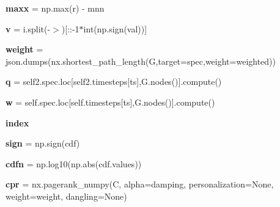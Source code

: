 \begin{DoxyCompactItemize}
{\bfseries maxx} = np.\+max(r) -\/ mnn
\item 
\mbox{\label{namespacedsmacc_1_1vis_1_1degree_a59c87c466c653809fae9841bcd32c50a}} 
{\bfseries v} = i.\+split(\textquotesingle{}-\/$>$\textquotesingle{})\mbox{[}\+::-\/1$\ast$int(np.\+sign(val))\mbox{]}
\item 
\mbox{\label{namespacedsmacc_1_1vis_1_1degree_a786d4650deeb1a42441417854f5e0d3d}} 
{\bfseries weight} = json.\+dumps(nx.\+shortest\+\_\+path\+\_\+length(G,target=spec,weight=\textquotesingle{}weighted\textquotesingle{}))
\item 
\mbox{\label{namespacedsmacc_1_1vis_1_1degree_ab4ec10eea9412ccc263613ab58af6801}} 
{\bfseries q} = self2.\+spec.\+loc\mbox{[}self2.\+timesteps\mbox{[}ts\mbox{]},G.\+nodes()\mbox{]}.compute()
\item 
\mbox{\label{namespacedsmacc_1_1vis_1_1degree_a66742a6a9321dd42f1c47bb67d12ef13}} 
{\bfseries w} = self.\+spec.\+loc\mbox{[}self.\+timesteps\mbox{[}ts\mbox{]},G.\+nodes()\mbox{]}.compute()
\item 
\mbox{\label{namespacedsmacc_1_1vis_1_1degree_a35f6746a73068c2d6fc773a56a6f695d}} 
{\bfseries index}
\item 
\mbox{\label{namespacedsmacc_1_1vis_1_1degree_a38a8e81b43ba523315b33ea71cc870a0}} 
{\bfseries sign} = np.\+sign(cdf)
\item 
\mbox{\label{namespacedsmacc_1_1vis_1_1degree_a59dc121c6d926d87b664f210eb1f8f05}} 
{\bfseries cdfn} = np.\+log10(np.\+abs(cdf.\+values))
\item 
\mbox{\label{namespacedsmacc_1_1vis_1_1degree_a2baeecdb267f3c1c4d64d55e64f56413}} 
{\bfseries cpr} = nx.\+pagerank\+\_\+numpy(C, alpha=damping, personalization=None, weight=\textquotesingle{}weight\textquotesingle{}, dangling=None)
\item 
\mbox{\label{namespacedsmacc_1_1vis_1_1degree_a9cd05f6db07f98fd18d24eaedacffbda}} 

\end{DoxyCompactItemize}
